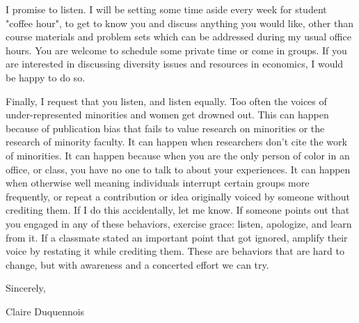 \documentclass[a4paper, 10pt]{article}
\begin{document}
I promise to listen. I will be setting some time aside every week for student "coffee hour", to get to know you and discuss anything you would like, other than course materials and problem sets which can be addressed during my usual office hours. You are welcome to schedule some private time or come in groups. If you are interested in discussing diversity issues and resources in economics, I would be happy to do so.  

Finally, I request that you listen, and listen equally. Too often the voices of under-represented minorities and women get drowned out. This can happen because of publication bias that fails to value research on minorities or the research of minority faculty. It can happen when researchers don't cite the work of minorities.  It can happen because when you are the only person of color in an office, or class, you have no one to talk to about your experiences. It can happen when otherwise well meaning individuals interrupt certain groups more frequently, or repeat a contribution or idea originally voiced by someone without crediting them. If I do this accidentally, let me know. If someone points out that you engaged in any of these behaviors, exercise grace: listen, apologize, and learn from it.  If a classmate stated an important point that got ignored, amplify their voice by restating it while crediting them. These are behaviors that are hard to change, but with awareness and a concerted effort we can try. 
\vspace{3mm}

\noindent Sincerely, 

\noindent Claire Duquennois
\end{document}
